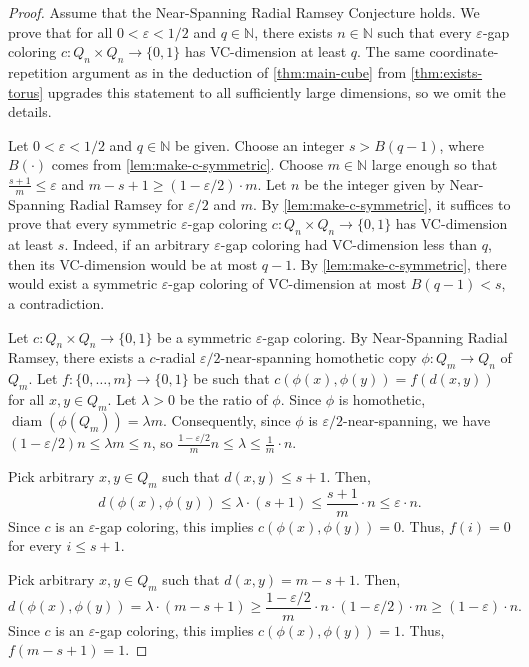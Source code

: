 \documentclass[11pt]{article}
\DeclareMathOperator{\diam}{diam}
\theoremstyle{remark}
\begin{document}
\begin{proof}
Assume that the Near-Spanning Radial Ramsey Conjecture holds.
We prove that for all $0 < \varepsilon < 1/2$ and $q \in \mathbb{N}$, there exists $n \in \mathbb{N}$ such that every $\varepsilon$-gap coloring $c : Q_n \times Q_n \to \{0, 1\}$ has VC-dimension at least $q$.
The same coordinate-repetition argument as in the deduction of \cref{thm:main-cube} from \cref{thm:exists-torus} upgrades this statement to all sufficiently large dimensions, so we omit the details.

Let $0 < \varepsilon < 1/2$ and $q \in \mathbb{N}$ be given.
Choose an integer $s > B(q-1)$, where $B(\cdot)$ comes from \cref{lem:make-c-symmetric}.
Choose $m \in \mathbb{N}$ large enough so that $\frac{s+1}{m} \leq \varepsilon$ and $m-s+1 \geq (1-\varepsilon/2) \cdot m$.
Let $n$ be the integer given by Near-Spanning Radial Ramsey for $\varepsilon/2$ and $m$.
By \cref{lem:make-c-symmetric}, it suffices to prove that every symmetric $\varepsilon$-gap coloring $c : Q_n \times Q_n \to \{0, 1\}$ has VC-dimension at least $s$.
Indeed, if an arbitrary $\varepsilon$-gap coloring had VC-dimension less than $q$, then its VC-dimension would be at most $q-1$.
By \cref{lem:make-c-symmetric}, there would exist a symmetric $\varepsilon$-gap coloring of VC-dimension at most $B(q-1) < s$, a contradiction.

Let $c : Q_n \times Q_n \to \{0, 1\}$ be a symmetric $\varepsilon$-gap coloring.
By Near-Spanning Radial Ramsey, there exists a $c$-radial $\varepsilon/2$-near-spanning homothetic copy $\phi : Q_m \to Q_n$ of $Q_m$.
Let $f : \{0, \ldots, m\} \to \{0, 1\}$ be such that $c(\phi(x), \phi(y)) = f(d(x, y))$ for all $x, y \in Q_m$.
Let $\lambda > 0$ be the ratio of $\phi$.
Since $\phi$ is homothetic, $\diam(\phi(Q_m)) = \lambda m$.
Consequently, since $\phi$ is $\varepsilon/2$-near-spanning, we have $(1-\varepsilon/2)n \leq \lambda m \leq n$, so $\frac{1-\varepsilon/2}{m}n \leq \lambda \leq \frac{1}{m} \cdot n$.

Pick arbitrary $x, y \in Q_m$ such that $d(x, y) \leq s+1$.
Then, \[d(\phi(x), \phi(y)) \leq \lambda \cdot (s+1) \leq \frac{s+1}{m} \cdot n \leq \varepsilon \cdot n.\]
Since $c$ is an $\varepsilon$-gap coloring, this implies $c(\phi(x), \phi(y)) = 0$. 
Thus, $f(i) = 0$ for every $i \leq s+1$.

Pick arbitrary $x, y \in Q_m$ such that $d(x, y) = m-s+1$.
Then, \[d(\phi(x), \phi(y)) = \lambda \cdot (m-s+1) \geq \frac{1-\varepsilon/2}{m} \cdot n \cdot (1 - \varepsilon/2) \cdot m \geq (1 - \varepsilon) \cdot n.\]
Since $c$ is an $\varepsilon$-gap coloring, this implies $c(\phi(x), \phi(y)) = 1$. 
Thus, $f(m-s+1) = 1$.


\end{proof}
\end{document}
